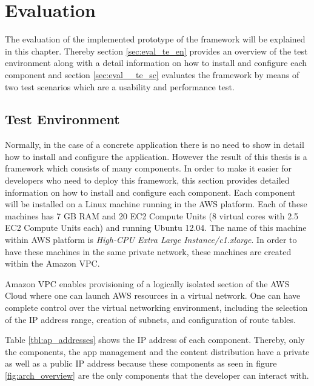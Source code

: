 \chapter{Evaluation\label{cha:chapter6}}
The evaluation of the implemented prototype of the framework will be explained in this chapter. Thereby section \ref{sec:eval_te_en}  provides an overview of the test environment along with a detail information on how to install and configure each component and section \ref{sec:eval__te_sc} evaluates the framework by means of two test scenarios which are a usability and performance test.

\section{Test Environment\label{sec:eval_te_en}}
Normally, in the case of a concrete application there is no need to show in detail how to install and configure the application. However the result of this thesis is a framework which consists of many components. In order to make it easier for developers who need to deploy this framework, this section provides detailed information on how to install and configure each component. Each component will be installed on a Linux machine running in the \ac{AWS} platform. Each of these machines has 7 GB RAM and 20 \ac{EC2} Compute Units (8 virtual cores with 2.5 \ac{EC2} Compute Units each) and running Ubuntu 12.04. The name of this machine within \ac{AWS} platform is \textit{High-CPU Extra Large Instance/c1.xlarge}. In order to have these machines in the same private network, these machines are created within the Amazon \ac{VPC}. 

Amazon \ac{VPC} enables provisioning of a logically isolated section of the AWS Cloud where one can launch AWS resources in a virtual network. One can have complete control over the virtual networking environment, including the selection of the IP address range, creation of subnets, and configuration of route tables.

Table \ref{tbl:ap_addresses} shows the IP address of each component. Thereby, only the components, the app management and the content distribution have a private as well as a public IP address because these components as seen in figure \ref{fig:arch_overview} are the only components that the developer can interact with. 

